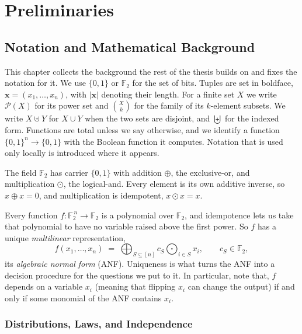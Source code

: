 \setlength{\parindent}{0pt}
\chapter{Preliminaries}
\label{chap:preliminaries}
\section{Notation and Mathematical Background}
\label{sec:notation}

This chapter collects the background the rest of the thesis builds on and fixes
the notation for it. We use $\{0,1\}$ or $\mathbb{F}_2$ for the set of
bits. Tuples are set in boldface, $\mathbf{x} = (x_1, \dots, x_n)$, with $|\mathbf{x}|$
denoting their length. For a finite set $X$ we write $\mathcal{P}(X)$ for its power set and
$\binom{X}{k}$ for the family of its $k$-element subsets. We write $X \uplus Y$
for $X \cup Y$ when the two sets are disjoint, and $\biguplus$ for the
indexed form. Functions are total
unless we say otherwise, and we identify a function $\{0,1\}^n \to \{0,1\}$ with the
Boolean function it computes. Notation that is used only locally is introduced
where it appears.
  \label{sec:field-f2}

  The field $\mathbb{F}_2$ has carrier $\{0,1\}$ with addition $\oplus$, the
  exclusive-or, and multiplication $\odot$, the logical-and. Every element is its
  own additive inverse,
  so $x \oplus x = 0$, and multiplication is idempotent, $x \odot x = x$.

  Every function $f : \mathbb{F}_2^{\,n} \to \mathbb{F}_2$ is a polynomial over
  $\mathbb{F}_2$, and idempotence lets us take that polynomial to have no variable
  raised above the first power. So $f$ has a unique \emph{multilinear}
  representation,
  \[
    f(x_1, \dots, x_n) \;=\; \bigoplus_{S \subseteq [n]} c_S \bigodot_{i \in S} x_i,
    \qquad c_S \in \mathbb{F}_2,
  \]
  its \emph{algebraic normal form} (ANF). Uniqueness is what turns the ANF into a
  decision procedure for the questions we put to it. In particular, note that, $f$ depends on a
  variable $x_i$ (meaning that flipping $x_i$ can change the output) if and only if
  some monomial of the ANF contains $x_i$.

  \subsection{Distributions, Laws, and Independence}
  \label{sec:prob-independence}

